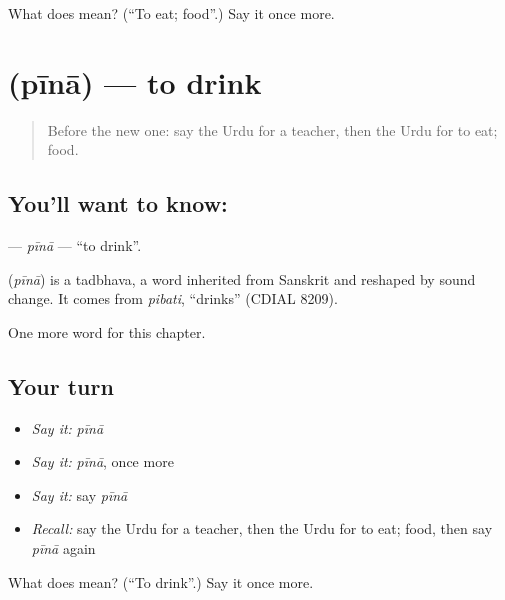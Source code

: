 \begin{tcolorbox}[breakable,colback=teal!4,colframe=teal!35!black,title={Before you move on}]
What does  mean? (\textquotedblleft{}To eat; food\textquotedblright{}.) Say it once more.
\end{tcolorbox}
\section[\texorpdfstring{\ur{پینا} (pīnā)}{پینا (pīnā)}]{ (pīnā) — to drink}

\label{lesson:UR-C46-pina}



\begin{quote}
Before the new one: say the Urdu for a teacher, then the Urdu for to eat; food.
\end{quote}

\subsection*{You'll want to know: }
\textbf{} — \emph{pīnā} — \textquotedblleft{}to drink\textquotedblright{}.

\begin{cousinweb}
\textbf{} (\emph{pīnā}) is a tadbhava, a word inherited from Sanskrit and reshaped by sound change. It comes from \emph{pibati}, \textquotedblleft{}drinks\textquotedblright{} (CDIAL 8209).
\end{cousinweb}

\begin{grammarlens}[title={What you've built}]
One more word for this chapter.
\end{grammarlens}

\subsection*{Your turn}
\begin{itemize}
\raggedright
  \item \emph{Say it:} \emph{pīnā}
  \item \emph{Say it:} \emph{pīnā}, once more
  \item \emph{Say it:} say \emph{pīnā}
  \item \emph{Recall:} say the Urdu for a teacher, then the Urdu for to eat; food, then say \emph{pīnā} again
\end{itemize}

\begin{tcolorbox}[breakable,colback=teal!4,colframe=teal!35!black,title={Before you move on}]
What does  mean? (\textquotedblleft{}To drink\textquotedblright{}.) Say it once more.
\end{tcolorbox}
